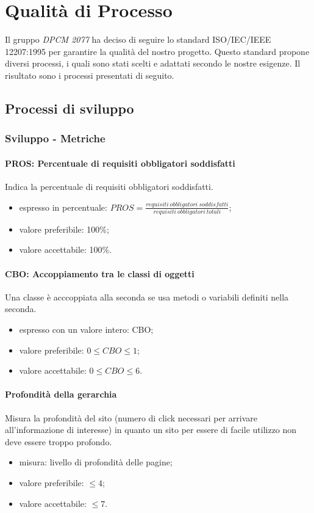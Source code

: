 \section{Qualità di Processo}
Il gruppo \textit{DPCM 2077} ha deciso di seguire lo standard ISO/IEC/IEEE 12207:1995 per garantire la qualità del nostro progetto. Questo standard propone diversi processi, i quali sono stati scelti e adattati secondo le nostre esigenze. 
Il risultato sono i processi presentati di seguito.
	\subsection{Processi di sviluppo}
		\subsubsection{Sviluppo - Metriche}
		\paragraph{PROS: Percentuale di requisiti obbligatori soddisfatti}
		Indica la percentuale di requisiti obbligatori soddisfatti.
		\begin{itemize}
		\item espresso in percentuale: $PROS = \frac{requisiti \ obbligatori \ soddisfatti}{requisiti \ obbligatori \ totali}$;
		\item valore preferibile: 100\%;
		\item valore accettabile: 100\%.
		\end{itemize}
		
		\paragraph{CBO: Accoppiamento tra le classi di oggetti}
		Una classe è acccoppiata alla seconda se usa metodi o variabili definiti nella seconda.
		\begin{itemize}
		\item espresso con un valore intero: CBO;
		\item valore preferibile: $0 \leq CBO \leq 1$;
		\item valore accettabile: $0 \leq CBO \leq 6$.
		\end{itemize}
		
		\paragraph{Profondità della gerarchia}
		Misura la profondità del sito (numero di click necessari per arrivare all'informazione di interesse) in quanto un sito per essere di facile utilizzo non deve essere troppo profondo.
		\begin{itemize}
		\item misura: livello di profondità delle pagine;
		\item valore preferibile: $\leq 4$;
		\item valore accettabile: $ \leq 7$.
		\end{itemize}
		
